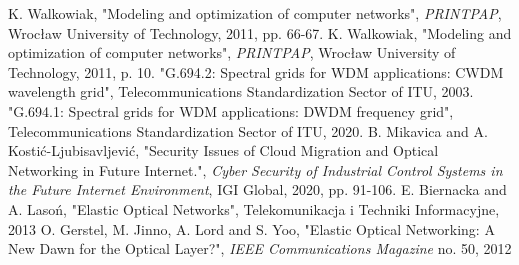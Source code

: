 \documentclass[conference]{IEEEtran}
\begin{document}
\begin{thebibliography}{00}
 K. Walkowiak, "Modeling and optimization of computer networks", \textit{PRINTPAP}, Wrocław University of Technology, 2011, pp. 66-67.
 K. Walkowiak, "Modeling and optimization of computer networks", \textit{PRINTPAP}, Wrocław University of Technology, 2011, p. 10.
 "G.694.2: Spectral grids for WDM applications: CWDM wavelength grid", Telecommunications Standardization Sector of ITU, 2003.
 "G.694.1: Spectral grids for WDM applications: DWDM frequency grid", Telecommunications Standardization Sector of ITU, 2020.
 B. Mikavica and A. Kostić-Ljubisavljević, "Security Issues of Cloud Migration and Optical Networking in Future Internet.", \textit{Cyber Security of Industrial Control Systems in the Future Internet Environment}, IGI Global, 2020, pp. 91-106.
 E. Biernacka and A. Lasoń, "Elastic Optical Networks", Telekomunikacja i Techniki Informacyjne, 2013
 O. Gerstel, M. Jinno, A. Lord and S. Yoo, "Elastic Optical Networking: A New Dawn for the Optical Layer?", \textit{IEEE Communications Magazine} no. 50, 2012
\end{thebibliography}
\end{document}
